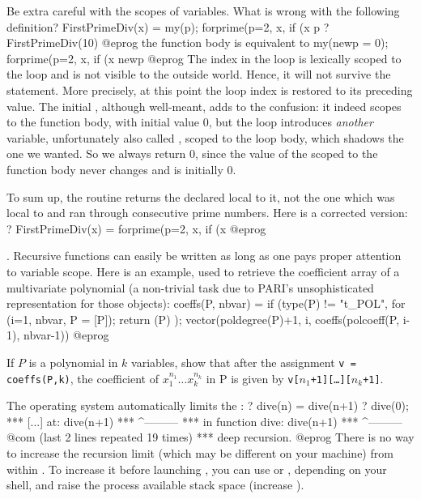 \label{se:bewarescope}
Be extra careful with the scopes of variables. What is wrong with the
following definition?
\bprog
FirstPrimeDiv(x) =
{ my(p);
  forprime(p=2, x, if (x%
  p
}
? FirstPrimeDiv(10)
@eprog\noindent {} the function body is equivalent to
\bprog
{ my(newp = 0);
  forprime(p=2, x, if (x%
  newp
}
@eprog\noindent
{} The index  in the 
loop is lexically scoped to the loop and is not visible to the outside world.
Hence, it will not survive the  statement. More precisely, at this
point the loop index is restored to its preceding value. The initial
, although well-meant, adds to the confusion: it indeed scopes
 to the function body, with initial value $0$, but the 
loop introduces \emph{another} variable, unfortunately also called ,
scoped to the loop body, which shadows the one we wanted. So we always return
$0$, since the value of the  scoped to the function body never changes
and is initially $0$.

To sum up, the routine returns the  declared local to
it, not the one which was local to  and ran through consecutive
prime numbers. Here is a corrected version:
\bprog
? FirstPrimeDiv(x) = forprime(p=2, x, if (x%
@eprog

. Recursive functions can easily
be written as long as one pays proper attention to variable scope. Here is an
example, used to retrieve the coefficient array of a multivariate polynomial
(a non-trivial task due to PARI's unsophisticated representation for those
objects): 
\bprog
coeffs(P, nbvar) =
{
  if (type(P) != "t_POL",
    for (i=1, nbvar, P = [P]);
    return (P)
  );
  vector(poldegree(P)+1, i, coeffs(polcoeff(P, i-1), nbvar-1))
}
@eprog

\noindent If $P$ is a polynomial in $k$ variables, show that after the
assignment {\tt v = coeffs(P,k)}, the coefficient of $x_1^{n_1}\dots
x_k^{n_k}$ in P is given by {\tt v[$n_1$+1][\dots][$n_k$+1]}.

The operating system automatically limits the :
\bprog
? dive(n) = dive(n+1)
? dive(0);
  ***   [...] at: dive(n+1)
  ***             ^---------
  ***   in function dive: dive(n+1)
  ***                     ^---------
  \\@com (last 2 lines repeated 19 times)
  ***   deep recursion.
@eprog\noindent
There is no way to increase the recursion limit (which may be different on
your machine) from within . To increase it before launching ,
you can use  or , depending on your shell, and raise
the process available stack space (increase ).

